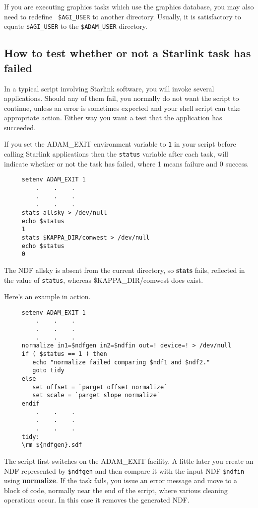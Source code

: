 \documentclass[twoside,11pt]{article}
\newcommand{\htmlref}[2]{#1}
\newcommand{\xref}[3]{#1}
\newcommand{\xlabel}[1]{}
\begin{document}
If you are executing graphics tasks which use the \xref{graphics
database}{sun95}{se_agitate}, you may also need to redefine {\tt
\$AGI\_USER} to another directory.  Usually, it is satisfactory to 
equate {\tt \$AGI\_USER} to the {\tt \$ADAM\_USER} directory.

\subsection{\xlabel{sc4_se_exit_status}How to test whether or not a
Starlink task has failed}\label{sc4_se_exit_status}

In a typical script involving Starlink software, you will invoke
several applications.  Should any of them fail, you normally do not
want the script to continue, unless an error is sometimes expected and
your shell script can take appropriate action.  Either way you want a
test that the application has succeeded.  

If you set the ADAM\_EXIT \htmlref{{\sf environment
variable}}{sc4_gl_env} to {\tt 1} in your script before calling
Starlink applications then the {\tt status} variable after each task,
will indicate whether or not the task has failed, where 1 means
failure and 0 success.

\small
\begin{verbatim}
     setenv ADAM_EXIT 1
         .    .    .
         .    .    .
         .    .    .
     stats allsky > /dev/null
     echo $status
     1
     stats $KAPPA_DIR/comwest > /dev/null
     echo $status
     0
\end{verbatim}
\normalsize

The NDF allsky is absent from the current directory, so {\bf stats}
fails, reflected in the value of {\tt status}, whereas 
\$KAPPA\_DIR/comwest does exist.

Here's an example in action.
\small
\begin{verbatim}
     setenv ADAM_EXIT 1
         .    .    .
         .    .    .
         .    .    .
     normalize in1=$ndfgen in2=$ndfin out=! device=! > /dev/null
     if ( $status == 1 ) then
        echo "normalize failed comparing $ndf1 and $ndf2."
        goto tidy
     else
        set offset = `parget offset normalize`
        set scale = `parget slope normalize`
     endif
         .    .    .
         .    .    .
         .    .    .
     tidy:
     \rm ${ndfgen}.sdf
\end{verbatim}
\normalsize

The script first switches on the ADAM\_EXIT facility.  A little later
you create an NDF represented by {\tt \$ndfgen} and then compare it with
the input NDF {\tt \$ndfin} using \xref{{\bf normalize}}{sun95}{NORMALIZE}.
If the task fails, you issue an error message and move to a block of
code, normally near the end of the script, where various cleaning 
operations occur.  In this case it removes the generated NDF.
\end{document}
